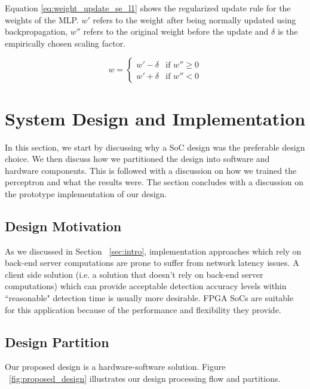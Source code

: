 \documentclass[sigconf]{acmart}
\theoremstyle{plain}
\theoremstyle{remark}
\begin{document}
Equation \ref{eq:weight_update_se_l1} shows the regularized update rule for the weights of the MLP. $w'$ refers to the weight after being normally updated using backpropagation, $w''$ refers to the original weight before the update and $\delta$ is the empirically chosen scaling factor. 
 
\begin{equation} \label{eq:weight_update_se_l1}
w = \begin{cases}
		w'-\delta  & \text{if } w'' \geq 0 \\
		w'+\delta & \text{if } w'' < 0
	\end{cases}
\end{equation}


\section{System Design and Implementation} \label{sec:design}

In this section, we start by discussing why a SoC design was the preferable design choice. We then discuss how we partitioned the design into software and hardware components. This is followed with a discussion on how we trained the perceptron and what the results were. The section concludes with a discussion on the prototype implementation of our design. 

\subsection{Design Motivation}

As we discussed in Section ~\ref{sec:intro}, implementation approaches which rely on back-end server computations are prone to suffer from network latency issues. A client side solution (i.e. a solution that doesn't rely on back-end server computations) which can provide acceptable detection accuracy levels within ``reasonable" detection time  is usually more desirable. FPGA SoCs are suitable for this application because of the performance and flexibility they provide.

\subsection{Design Partition}

Our proposed design is a hardware-software solution. Figure ~\ref{fig:proposed_design} illustrates our design processing flow and partitions.
\end{document}
